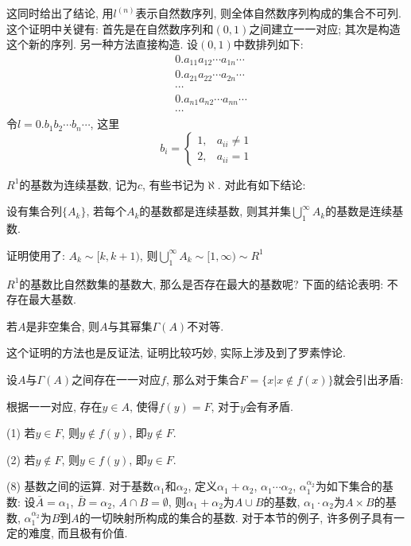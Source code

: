 \documentclass[12pt,a4paper,openany]{book}
\begin{document}
这同时给出了结论, 用$l^{(n)}$表示自然数序列, 则全体自然数序列构成的集合不可列. 这个证明中关键有: 首先是在自然数序列和$(0, 1)$之间建立一一对应; 其次是构造这个新的序列. 另一种方法直接构造. 设$(0, 1)$中数排列如下:
$$
\begin{aligned}
&0.a_{11}a_{12}\cdots a_{1n}\cdots \\
&0.a_{21}a_{22}\cdots a_{2n}\cdots \\
&\cdots \\
&0.a_{n1}a_{n2}\cdots a_{nn}\cdots \\
&\cdots
\end{aligned}
$$
令$l = 0.b_1b_2 \cdots b_n \cdots$, 这里
$$
b_i = 
\begin{cases}
1, &a_{ii} \neq 1 \\
2, &a_{ii} = 1
\end{cases}
$$

$R^1$的基数为连续基数, 记为$c$, 有些书记为$\aleph$. 对此有如下结论:

设有集合列$\{A_k\}$, 若每个$A_k$的基数都是连续基数, 则其并集$\bigcup\limits_{1}^{\infty}{A_k}$的基数是连续基数.

证明使用了: $A_k \sim [k, k+1)$, 则$\bigcup\limits_{1}^{\infty}{A_k} \sim [1, \infty) \sim R^1$

$R^1$的基数比自然数集的基数大, 那么是否存在最大的基数呢? 下面的结论表明: 不存在最大基数.

若$A$是非空集合, 则$A$与其幂集$\Gamma(A)$不对等.

这个证明的方法也是反证法, 证明比较巧妙, 实际上涉及到了罗素悖论.

设$A$与$\Gamma(A)$之间存在一一对应$f$, 那么对于集合$F = \{x | x \notin f(x) \}$就会引出矛盾:

根据一一对应, 存在$y \in A$, 使得$f(y) = F$, 对于$y$会有矛盾.

(1) 若$y \in F$, 则$y \notin f(y)$, 即$y \notin F$.

(2) 若$y \notin F$, 则$y \in f(y)$, 即$y \in F$.

(8) 基数之间的运算.
对于基数$\alpha_1$和$\alpha_2$, 定义$\alpha_1 + \alpha_2$, $\alpha_1 \cdots \alpha_2$, $\alpha_1^{\alpha_2}$为如下集合的基数: 设$\bar{A} = \alpha_1$, $\bar{B} = \alpha_2$, $A \cap B = \emptyset$, 则$\alpha_1 + \alpha_2$为$A \cup B$的基数, $\alpha_1\cdot\alpha_2$为$A \times B$的基数, $\alpha_1^{\alpha_2}$为$B$到$A$的一切映射所构成的集合的基数. 对于本节的例子, 许多例子具有一定的难度, 而且极有价值.
\end{document}
